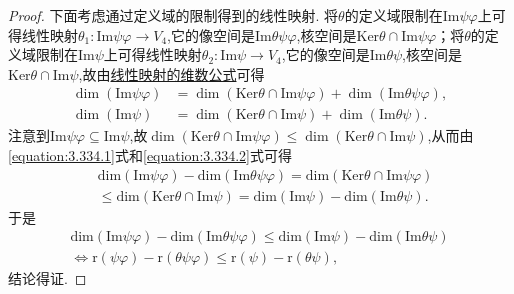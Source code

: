 \documentclass[../../main.tex]{subfiles}%
\begin{document}
\begin{proof}
下面考虑通过定义域的限制得到的线性映射. 将\(\theta\)的定义域限制在\(\text{Im}\psi\varphi\)上可得线性映射\(\theta_1:\text{Im}\psi\varphi\to V_4\),它的像空间是\(\text{Im}\theta\psi\varphi\),核空间是\(\text{Ker}\theta\cap\text{Im}\psi\varphi\)；将\(\theta\)的定义域限制在\(\text{Im}\psi\)上可得线性映射\(\theta_2:\text{Im}\psi\to V_4\),它的像空间是\(\text{Im}\theta\psi\),核空间是\(\text{Ker}\theta\cap\text{Im}\psi\),故由\hyperref[theorem:值域和核空间维数之和等于原像空间维数]{线性映射的维数公式}可得
\begin{align}
\dim(\text{Im}\psi\varphi)&=\dim(\text{Ker}\theta\cap\text{Im}\psi\varphi)+\dim(\text{Im}\theta\psi\varphi),\label{equation:3.334.1}\\
\dim(\text{Im}\psi)&=\dim(\text{Ker}\theta\cap\text{Im}\psi)+\dim(\text{Im}\theta\psi).\label{equation:3.334.2}
\end{align}
注意到\(\text{Im}\psi\varphi\subseteq\text{Im}\psi\),故\(\dim(\text{Ker}\theta\cap\text{Im}\psi\varphi)\leqslant \dim(\text{Ker}\theta\cap\text{Im}\psi)\),从而由\eqref{equation:3.334.1}式和\eqref{equation:3.334.2}式可得
\begin{align*}
&\mathrm{dim}\left( \mathrm{Im}\psi \varphi \right) -\mathrm{dim}\left( \mathrm{Im}\theta \psi \varphi \right) =\mathrm{dim}\left( \mathrm{Ker}\theta \cap \mathrm{Im}\psi \varphi \right) 
\\
&\leqslant \mathrm{dim}\left( \mathrm{Ker}\theta \cap \mathrm{Im}\psi \right) =\mathrm{dim}\left( \mathrm{Im}\psi \right) -\mathrm{dim}\left( \mathrm{Im}\theta \psi \right) .
\end{align*}
于是
\begin{gather*}
\mathrm{dim}\left( \mathrm{Im}\psi \varphi \right) -\mathrm{dim}\left( \mathrm{Im}\theta \psi \varphi \right) \leqslant \mathrm{dim}\left( \mathrm{Im}\psi \right) -\mathrm{dim}\left( \mathrm{Im}\theta \psi \right) 
\\
\Leftrightarrow \text{r}(\psi\varphi)-\text{r}(\theta\psi\varphi)\leqslant \text{r}(\psi)-\text{r}(\theta\psi),
\end{gather*}
结论得证. 

\end{proof}
\end{document}

